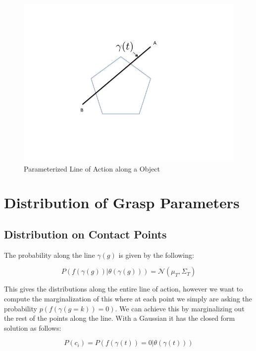 \documentclass[letterpaper, 10 pt, conference]{ieeeconf}  %
\newcommand{\mN}{\mathcal{N}}
\begin{document}
\begin{figure}[ht!]
\centering
\includegraphics[scale = 0.3]{figures/Slide1.jpg}
\caption{Parameterized Line of Action along a Object}
\vspace*{-10pt}
\label{fig:line_of_action}
\end{figure}


\section{Distribution of Grasp Parameters}


\subsection{Distribution on Contact Points} The probability along the line $\gamma(g)$ is given by the following:

\begin{equation}
P(f(\gamma(g))|\theta(\gamma(g))) 
=
\mN(\mu_T,\Sigma_T)
\end{equation}


This gives the distributions along the entire line of action, however we want to compute the marginalization of this where at each point we simply are asking the probability $p(f(\gamma(g=k))=0)$.
We can achieve this by marginalizing out the rest of the points along the line.
With a Gaussian it has the closed form solution as follows: 

\begin{equation}
P(c_{i}) =  P(f(\gamma(t))=0|\theta(\gamma(t)))
\end{equation}
\end{document}
